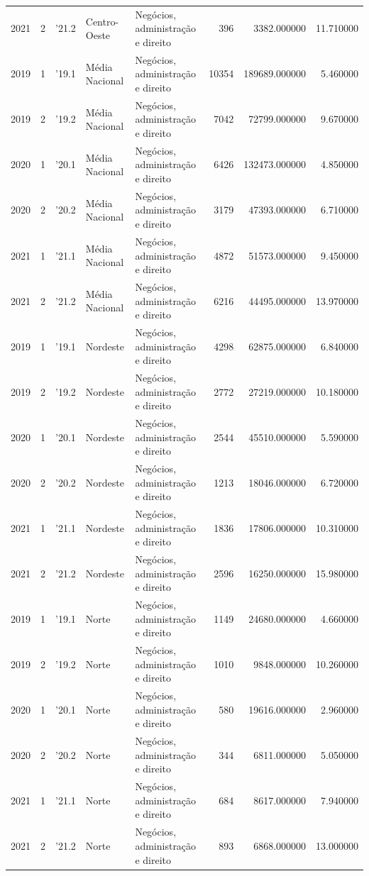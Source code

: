\begin{longtable}{rrlllrrr}
2021 & 2 & '21.2 & Centro-Oeste & Negócios, administração e direito & 396 & 3382.000000 & 11.710000 \\
2019 & 1 & '19.1 & Média Nacional & Negócios, administração e direito & 10354 & 189689.000000 & 5.460000 \\
2019 & 2 & '19.2 & Média Nacional & Negócios, administração e direito & 7042 & 72799.000000 & 9.670000 \\
2020 & 1 & '20.1 & Média Nacional & Negócios, administração e direito & 6426 & 132473.000000 & 4.850000 \\
2020 & 2 & '20.2 & Média Nacional & Negócios, administração e direito & 3179 & 47393.000000 & 6.710000 \\
2021 & 1 & '21.1 & Média Nacional & Negócios, administração e direito & 4872 & 51573.000000 & 9.450000 \\
2021 & 2 & '21.2 & Média Nacional & Negócios, administração e direito & 6216 & 44495.000000 & 13.970000 \\
2019 & 1 & '19.1 & Nordeste & Negócios, administração e direito & 4298 & 62875.000000 & 6.840000 \\
2019 & 2 & '19.2 & Nordeste & Negócios, administração e direito & 2772 & 27219.000000 & 10.180000 \\
2020 & 1 & '20.1 & Nordeste & Negócios, administração e direito & 2544 & 45510.000000 & 5.590000 \\
2020 & 2 & '20.2 & Nordeste & Negócios, administração e direito & 1213 & 18046.000000 & 6.720000 \\
2021 & 1 & '21.1 & Nordeste & Negócios, administração e direito & 1836 & 17806.000000 & 10.310000 \\
2021 & 2 & '21.2 & Nordeste & Negócios, administração e direito & 2596 & 16250.000000 & 15.980000 \\
2019 & 1 & '19.1 & Norte & Negócios, administração e direito & 1149 & 24680.000000 & 4.660000 \\
2019 & 2 & '19.2 & Norte & Negócios, administração e direito & 1010 & 9848.000000 & 10.260000 \\
2020 & 1 & '20.1 & Norte & Negócios, administração e direito & 580 & 19616.000000 & 2.960000 \\
2020 & 2 & '20.2 & Norte & Negócios, administração e direito & 344 & 6811.000000 & 5.050000 \\
2021 & 1 & '21.1 & Norte & Negócios, administração e direito & 684 & 8617.000000 & 7.940000 \\
2021 & 2 & '21.2 & Norte & Negócios, administração e direito & 893 & 6868.000000 & 13.000000 \\

\end{longtable}
